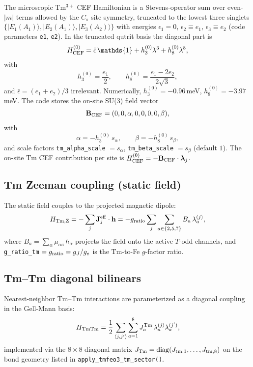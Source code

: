 \documentclass[11pt]{article}
\DeclareMathOperator{\diag}{diag}
\newcommand{\bh}{\mathbf{h}}
\newcommand{\Jeff}{\mathbf{J}^{\rm eff}}
\begin{document}
The microscopic Tm$^{3+}$ CEF Hamiltonian is a Stevens-operator
sum over even-$|m|$ terms allowed by the $C_s$ site symmetry,
truncated to the lowest three singlets
$\{|E_1(A_1)\rangle, |E_2(A_1)\rangle, |E_3(A_2)\rangle\}$ with
energies $\epsilon_1 = 0$, $\epsilon_2 \equiv e_1$,
$\epsilon_3 \equiv e_2$ (code parameters \texttt{e1}, \texttt{e2}).
In the truncated qutrit basis the diagonal part is
\begin{equation}
H_{\rm CEF}^{(0)} = \bar\epsilon\,\mathds{1}
+ h_3^{(0)}\lambda^3 + h_8^{(0)}\lambda^8,
\label{eq:HTm0}
\end{equation}
with
\begin{equation}
h_3^{(0)} = \frac{e_1}{2},\qquad
h_8^{(0)} = \frac{e_1 - 2e_2}{2\sqrt{3}},
\end{equation}
and $\bar\epsilon = (e_1 + e_2)/3$ irrelevant.  Numerically,
$h_3^{(0)} = -0.96$\,meV, $h_8^{(0)} = -3.97$\,meV.  The code stores
the on-site SU(3) field vector
\begin{equation}
\mathbf{B}_{\rm CEF} = (0, 0, \alpha, 0, 0, 0, 0, \beta),
\end{equation}
with
\begin{equation}
\alpha = -h_3^{(0)}\,s_\alpha,\qquad
\beta  = -h_8^{(0)}\,s_\beta,
\end{equation}
and scale factors \texttt{tm\_alpha\_scale} $= s_\alpha$,
\texttt{tm\_beta\_scale} $= s_\beta$ (default $1$).
The on-site Tm CEF contribution per site is
$H_{\rm CEF}^{(0)} = -\mathbf{B}_{\rm CEF}\cdot\boldsymbol\lambda_j$.

\subsection{Tm Zeeman coupling (static field)}

The static field couples to the projected magnetic dipole:
\begin{equation}
H_{\rm Tm,Z} = -\sum_j \Jeff_j \cdot \bh
= -g_{\rm ratio}\sum_j\sum_{a\in\{2,5,7\}} B_a\,\lambda_a^{(j)},
\end{equation}
where $B_a = \sum_\alpha \mu_{\alpha a}\,h_\alpha$ projects the field
onto the active $T$-odd channels, and
\texttt{g\_ratio\_tm} $= g_{\rm ratio} = g_J/g_e$ is the
Tm-to-Fe $g$-factor ratio.

\subsection{Tm--Tm diagonal bilinears}

Nearest-neighbor Tm--Tm interactions are parameterized as a diagonal
coupling in the Gell-Mann basis:
\begin{equation}
H_{\rm TmTm} = \frac{1}{2}\sum_{\langle j,j'\rangle}\sum_{a=1}^{8}
J_a^{\rm Tm}\,\lambda_a^{(j)}\lambda_a^{(j')},
\end{equation}
implemented via the $8\times 8$ diagonal matrix
$J_{\rm Tm} = \diag(J_{\rm tm,1}, \dots, J_{\rm tm,8})$ on the
bond geometry listed in \texttt{apply\_tmfeo3\_tm\_sector()}.
\end{document}

